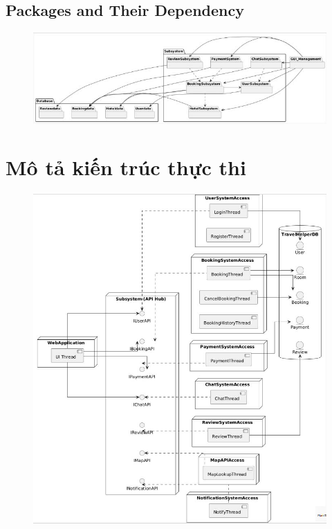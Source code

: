 \subsection{Packages and Their Dependency}
\begin{figure}[H]
    \centering
    \includegraphics[width=\textwidth]{img3.1.5/Blank 2 Grids Collage_0.jpg} 
\end{figure}

\section{Mô tả kiến trúc thực thi}
\begin{figure}[H]
    \centering
    \includegraphics[width=\linewidth]{img3.2/1.jpg}
\end{figure}

